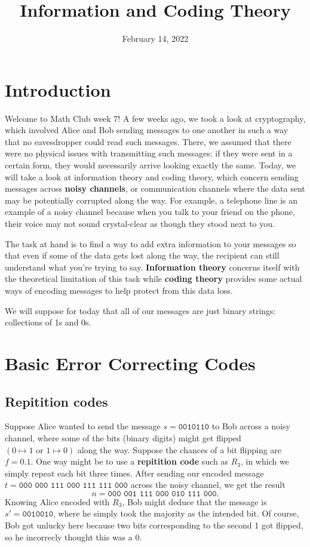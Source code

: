 \documentclass{article}
\title{Information and Coding Theory}
\author{}
\date{February 14, 2022}
\begin{document}
\section{Introduction}

Welcome to Math Club week 7!
A few weeks ago, we took a look at cryptography, which involved Alice and Bob sending messages to one another in such a way that no eavesdropper could read such messages.
There, we assumed that there were no physical issues with transmitting such messages: if they were sent in a certain form, they would necessarily arrive looking exactly the same.
Today, we will take a look at information theory and coding theory, which concern sending messages across \textbf{noisy channels}, or communication channels where the data sent may be potentially corrupted along the way. 
For example, a telephone line is an example of a noisy channel because when you talk to your friend on the phone, their voice may not sound crystal-clear as though they stood next to you.

The task at hand is to find a way to add extra information to your messages so that even if some of the data gets lost along the way, the recipient can still understand what you're trying to say. 
\textbf{Information theory} concerns itself with the theoretical limitation of this task while \textbf{coding theory} provides some actual ways of encoding messages to help protect from this data loss.

We will suppose for today that all of our messages are just binary strings: collections of 1s and 0s.

\section{Basic Error Correcting Codes}

\subsection{Repitition codes}

Suppose Alice wanted to send the message \(s = \texttt{0010110}\) to Bob across a noisy channel, where some of the bits (binary digits) might get flipped \((0\mapsto 1\textrm{ or }1\mapsto 0)\) along the way.
Suppose the chances of a bit flipping are \(f=0.1\).
One way might be to use a \textbf{repitition code} such as \(R_3\), in which we simply repeat each bit three times.
After sending our encoded message \(t = \texttt{000 000 111 000 111 111 000}\) across the noisy channel, we get the result
\[n = \texttt{000 001 111 000 010 111 000}.\]
Knowing Alice encoded with \(R_3\), Bob might deduce that the message is \(s' = \texttt{0010010}\), where he simply took the majority as the intended bit. 
Of course, Bob got unlucky here because two bits corresponding to the second 1 got flipped, so he incorrecly thought this was a 0.
\end{document}
